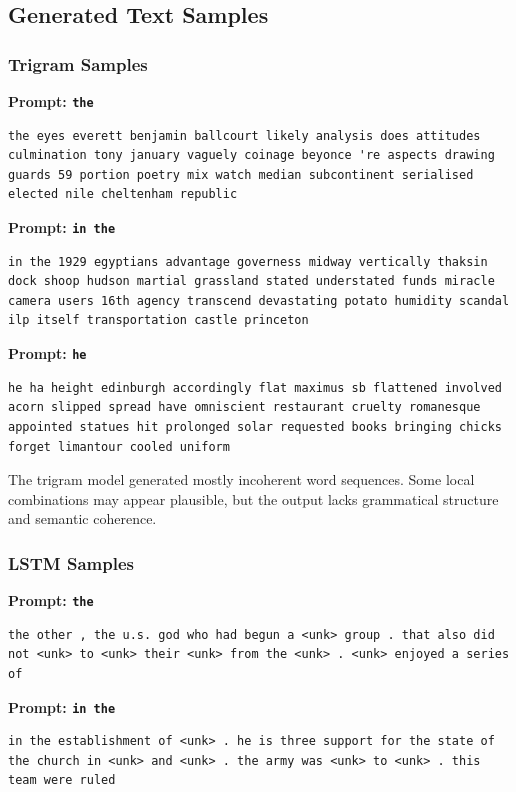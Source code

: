 \documentclass[11pt,a4paper]{article}
\begin{document}
\subsection{Generated Text Samples}

\subsubsection{Trigram Samples}

\textbf{Prompt: \texttt{the}}
\begin{lstlisting}
the eyes everett benjamin ballcourt likely analysis does attitudes culmination tony january vaguely coinage beyonce 're aspects drawing guards 59 portion poetry mix watch median subcontinent serialised elected nile cheltenham republic
\end{lstlisting}

\textbf{Prompt: \texttt{in the}}
\begin{lstlisting}
in the 1929 egyptians advantage governess midway vertically thaksin dock shoop hudson martial grassland stated understated funds miracle camera users 16th agency transcend devastating potato humidity scandal ilp itself transportation castle princeton
\end{lstlisting}

\textbf{Prompt: \texttt{he}}
\begin{lstlisting}
he ha height edinburgh accordingly flat maximus sb flattened involved acorn slipped spread have omniscient restaurant cruelty romanesque appointed statues hit prolonged solar requested books bringing chicks forget limantour cooled uniform
\end{lstlisting}

The trigram model generated mostly incoherent word sequences. Some local combinations may appear plausible, but the output lacks grammatical structure and semantic coherence.

\subsubsection{LSTM Samples}

\textbf{Prompt: \texttt{the}}
\begin{lstlisting}
the other , the u.s. god who had begun a <unk> group . that also did not <unk> to <unk> their <unk> from the <unk> . <unk> enjoyed a series of
\end{lstlisting}

\textbf{Prompt: \texttt{in the}}
\begin{lstlisting}
in the establishment of <unk> . he is three support for the state of the church in <unk> and <unk> . the army was <unk> to <unk> . this team were ruled
\end{lstlisting}
\end{document}
